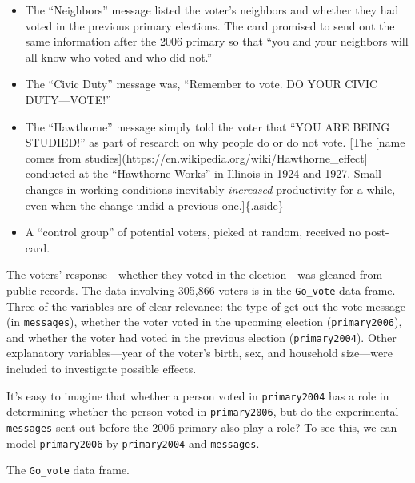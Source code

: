 \documentclass[
  letterpaper,
  DIV=11,
  numbers=noendperiod,
  oneside]{scrartcl}
\begin{document}
\begin{itemize}
\item
  The ``Neighbors'' message listed the voter's neighbors and whether
  they had voted in the previous primary elections. The card promised to
  send out the same information after the 2006 primary so that ``you and
  your neighbors will all know who voted and who did not.''
\item
  The ``Civic Duty'' message was, ``Remember to vote. DO YOUR CIVIC
  DUTY---VOTE!''
\item
  The ``Hawthorne'' message simply told the voter that ``YOU ARE BEING
  STUDIED!'' as part of research on why people do or do not vote. {[}The
  {[}name comes from
  studies{]}(https://en.wikipedia.org/wiki/Hawthorne\_effect{]}
  conducted at the ``Hawthorne Works'' in Illinois in 1924 and 1927.
  Small changes in working conditions inevitably \emph{increased}
  productivity for a while, even when the change undid a previous
  one.{]}\{.aside\}
\item
  A ``control group'' of potential voters, picked at random, received no
  post-card.
\end{itemize}

The voters' response---whether they voted in the election---was gleaned
from public records. The data involving 305,866 voters is in the
\texttt{Go\_vote} data frame. Three of the variables are of clear
relevance: the type of get-out-the-vote message (in \texttt{messages}),
whether the voter voted in the upcoming election (\texttt{primary2006}),
and whether the voter had voted in the previous election
(\texttt{primary2004}). Other explanatory variables---year of the
voter's birth, sex, and household size---were included to investigate
possible effects.

It's easy to imagine that whether a person voted in \texttt{primary2004}
has a role in determining whether the person voted in
\texttt{primary2006}, but do the experimental \texttt{messages} sent out
before the 2006 primary also play a role? To see this, we can model
\texttt{primary2006} by \texttt{primary2004} and \texttt{messages}.

\begin{table}

\caption{\label{tbl-go-vote-preview}The \texttt{Go\_vote} data frame.}


\end{table}%
\end{document}
